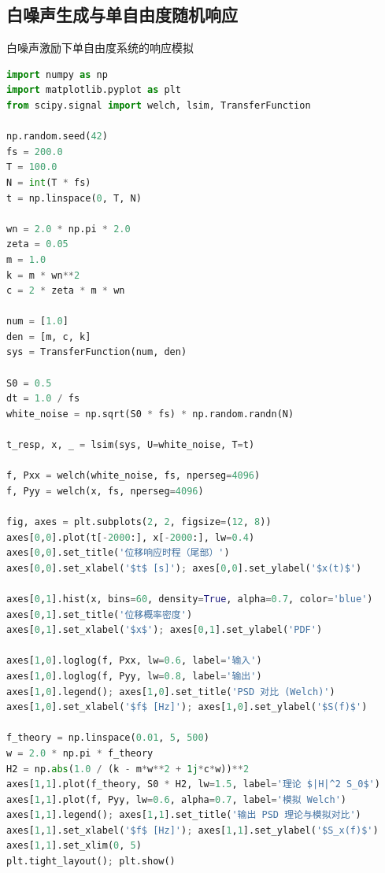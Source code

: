 \subsection{白噪声生成与单自由度随机响应}
\begin{mycode}{白噪声激励下单自由度系统的响应模拟}
\begin{lstlisting}[language=Python]
import numpy as np
import matplotlib.pyplot as plt
from scipy.signal import welch, lsim, TransferFunction

np.random.seed(42)
fs = 200.0
T = 100.0
N = int(T * fs)
t = np.linspace(0, T, N)

wn = 2.0 * np.pi * 2.0
zeta = 0.05
m = 1.0
k = m * wn**2
c = 2 * zeta * m * wn

num = [1.0]
den = [m, c, k]
sys = TransferFunction(num, den)

S0 = 0.5
dt = 1.0 / fs
white_noise = np.sqrt(S0 * fs) * np.random.randn(N)

t_resp, x, _ = lsim(sys, U=white_noise, T=t)

f, Pxx = welch(white_noise, fs, nperseg=4096)
f, Pyy = welch(x, fs, nperseg=4096)

fig, axes = plt.subplots(2, 2, figsize=(12, 8))
axes[0,0].plot(t[-2000:], x[-2000:], lw=0.4)
axes[0,0].set_title('位移响应时程（尾部）')
axes[0,0].set_xlabel('$t$ [s]'); axes[0,0].set_ylabel('$x(t)$')

axes[0,1].hist(x, bins=60, density=True, alpha=0.7, color='blue')
axes[0,1].set_title('位移概率密度')
axes[0,1].set_xlabel('$x$'); axes[0,1].set_ylabel('PDF')

axes[1,0].loglog(f, Pxx, lw=0.6, label='输入')
axes[1,0].loglog(f, Pyy, lw=0.8, label='输出')
axes[1,0].legend(); axes[1,0].set_title('PSD 对比 (Welch)')
axes[1,0].set_xlabel('$f$ [Hz]'); axes[1,0].set_ylabel('$S(f)$')

f_theory = np.linspace(0.01, 5, 500)
w = 2.0 * np.pi * f_theory
H2 = np.abs(1.0 / (k - m*w**2 + 1j*c*w))**2
axes[1,1].plot(f_theory, S0 * H2, lw=1.5, label='理论 $|H|^2 S_0$')
axes[1,1].plot(f, Pyy, lw=0.6, alpha=0.7, label='模拟 Welch')
axes[1,1].legend(); axes[1,1].set_title('输出 PSD 理论与模拟对比')
axes[1,1].set_xlabel('$f$ [Hz]'); axes[1,1].set_ylabel('$S_x(f)$')
axes[1,1].set_xlim(0, 5)
plt.tight_layout(); plt.show()
\end{lstlisting}
\end{mycode}

